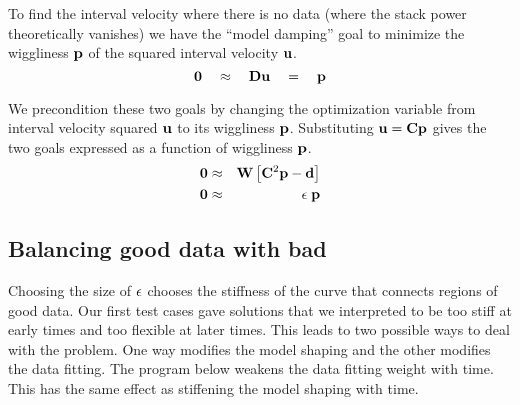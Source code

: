 \par
To find the interval velocity
where there is no data (where the stack power theoretically vanishes)
we have the ``model damping'' goal to minimize
the wiggliness $\bold p$
of the squared interval velocity $\bold u$.
\begin{equation}
\bold 0
\quad\approx\quad
\bold D \bold u \quad =\quad \bold p
\end{equation}
\par
We precondition these two goals
by changing the optimization variable from
interval velocity squared
$\bold u$ to its wiggliness $\bold p$.
Substituting $\bold u=\bold C\bold p$ gives the two goals
expressed as a function of wiggliness $\bold p$.
\begin{eqnarray}
\label{eqn:model}
\bold 0
&\approx&
\bold W
\left[
\bold C^2\bold p
-
\bold d
\right]
\\
\bold 0
&\approx&
\epsilon \; \bold p
\end{eqnarray}
\subsection{Balancing good data with bad}
Choosing the size of $\bold \epsilon$ chooses
the stiffness of the curve that connects regions of good data.
Our first test cases gave solutions
that we interpreted to be
too stiff at early times and too flexible at later times.
This leads to two possible ways to deal with the problem.
One way modifies the model shaping
and the other modifies the data fitting.
The program below weakens the data fitting weight with time.
This has the same effect as stiffening the model shaping with time.






